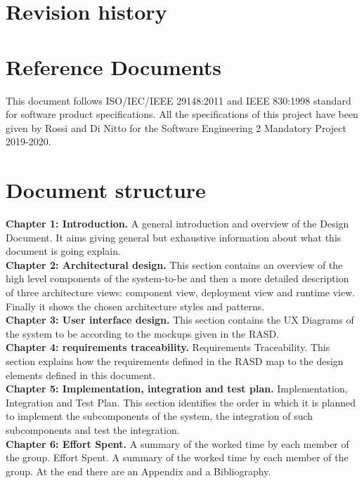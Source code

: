 \documentclass[../RASD.tex]{subfiles}
\begin{document}
    \section{Revision history}\label{sec:revision-history}
    \newpage
    \section{Reference Documents}\label{sec:reference-documents}
    This document follows ISO/IEC/IEEE 29148:2011 and IEEE 830:1998 standard for software product specifications.
    All the specifications of this project have been given by Rossi and Di Nitto for the Software Engineering 2 Mandatory Project 2019-2020.
    \newpage
    \section{Document structure}\label{sec:document-structure}
    \textbf{Chapter 1: Introduction.}
    A general introduction and overview of the Design Document. It aims giving general but exhaustive information about what this document is going explain.
    \\
    \textbf{Chapter 2: Architectural design.}
    This section contains an overview of the high level components of the system-to-be and then a more detailed description of three architecture views: component view, deployment view and runtime view. Finally it shows the chosen architecture styles and patterns.
    \\
    \textbf{Chapter 3: User interface design.}
    This section contains the UX Diagrams of the system to be according to the mockups given in the RASD.
    \\
    \textbf{Chapter 4: requirements traceability.}
    Requirements Traceability. This section explains how the requirements defined in the RASD map to the design elements defined in this document.
    \\
    \textbf{Chapter 5: Implementation, integration and test plan.}
    Implementation, Integration and Test Plan. This section identifies the order in which it is planned to implement the subcomponents of the system, the integration of such subcomponents and test the integration.
    \\
    \textbf{Chapter 6: Effort Spent.} A summary of the worked time by each member of the group.
    Effort Spent. A summary of the worked time by each member of the group. At the end there are an Appendix and a Bibliography.
\end{document}
